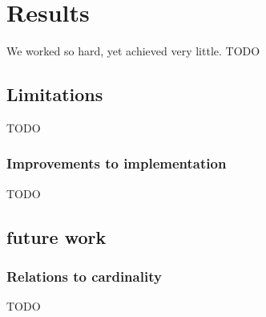 \documentclass[12pt]{report}
\theoremstyle{definition}
\theoremstyle{theorem}
\begin{document}
\chapter{Results}\label{results}
We worked so hard, yet achieved very little. TODO

\section{Limitations}\label{limitations}

TODO

\subsection{Improvements to implementation}
TODO

\section{future work}
\subsection{Relations to cardinality}
TODO



\end{document}
